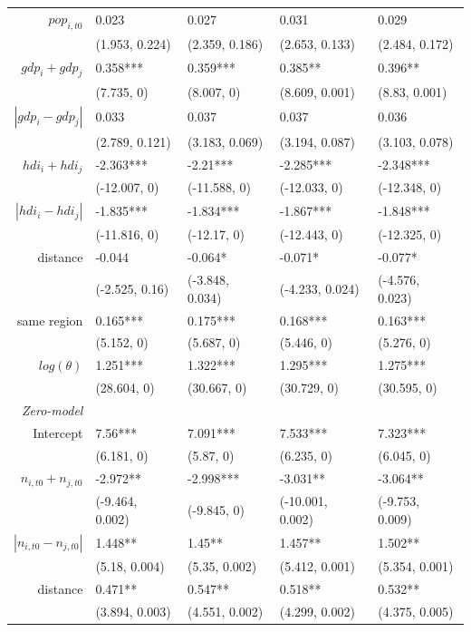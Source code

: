 \begin{table}[ht]
\begin{threeparttable}
\begin{small}
\begin{tabular}{rllll}
     $pop_{i,t0}$ & 0.023 & 0.027 & 0.031 & 0.029 \\ 
   & (1.953, 0.224) & (2.359, 0.186) & (2.653, 0.133) & (2.484, 0.172) \\ 
  $gdp_i + gdp_j$ & 0.358*** & 0.359*** & 0.385** & 0.396** \\ 
   & (7.735, 0) & (8.007, 0) & (8.609, 0.001) & (8.83, 0.001) \\ 
  $|gdp_i - gdp_j|$ & 0.033 & 0.037 & 0.037 & 0.036 \\ 
   & (2.789, 0.121) & (3.183, 0.069) & (3.194, 0.087) & (3.103, 0.078) \\ 
 $hdi_i + hdi_j$ & -2.363*** & -2.21*** & -2.285*** & -2.348*** \\ 
   & (-12.007, 0) & (-11.588, 0) & (-12.033, 0) & (-12.348, 0) \\ 
 $|hdi_i - hdi_j|$ & -1.835*** & -1.834*** & -1.867*** & -1.848*** \\ 
   & (-11.816, 0) & (-12.17, 0) & (-12.443, 0) & (-12.325, 0) \\ 
  distance & -0.044 & -0.064* & -0.071* & -0.077* \\ 
   & (-2.525, 0.16) & (-3.848, 0.034) & (-4.233, 0.024) & (-4.576, 0.023) \\ 
  same region & 0.165*** & 0.175*** & 0.168*** & 0.163*** \\ 
   & (5.152, 0) & (5.687, 0) & (5.446, 0) & (5.276, 0) \\ 
     $log(\theta)$  & 1.251*** & 1.322*** & 1.295*** & 1.275*** \\ 
 & (28.604, 0) & (30.667, 0) & (30.729, 0) & (30.595, 0) \\ 
   \noalign{\smallskip}\hline\noalign{\smallskip}
      	\textit{Zero-model} & & & &  \\
\noalign{\smallskip}
     Intercept & 7.56*** & 7.091*** & 7.533*** & 7.323*** \\ 
   & (6.181, 0) & (5.87, 0) & (6.235, 0) & (6.045, 0) \\ 
  $n_{i,t0} + n_{j,t0}$ & -2.972** & -2.998*** & -3.031** & -3.064** \\ 
   & (-9.464, 0.002) & (-9.845, 0) & (-10.001, 0.002) & (-9.753, 0.009) \\ 
  $|n_{i,t0} - n_{j,t0}|$ & 1.448** & 1.45** & 1.457** & 1.502** \\ 
   & (5.18, 0.004) & (5.35, 0.002) & (5.412, 0.001) & (5.354, 0.001) \\ 
  distance & 0.471** & 0.547** & 0.518** & 0.532** \\ 
   & (3.894, 0.003) & (4.551, 0.002) & (4.299, 0.002) & (4.375, 0.005) \\ 

\end{tabular}
\end{small}
\end{threeparttable}
\end{table}
